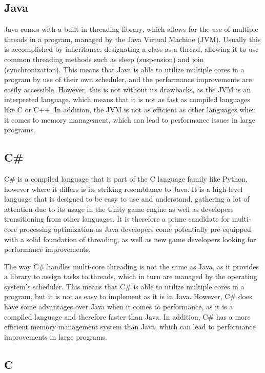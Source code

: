 \documentclass{article}
\begin{document}
\subsection{Java}

Java comes with a built-in threading library, which allows for the use of multiple threads in a program, managed by the Java Virtual Machine (JVM). Usually this is accomplished by inheritance, designating a class as a thread, allowing it to use common threading methods such as sleep (suspension) and join (synchronization). This means that Java is able to utilize multiple cores in a program by use of their own scheduler, and the performance improvements are easily accessible. However, this is not without its drawbacks, as the JVM is an interpreted language, which means that it is not as fast as compiled languages like C or C++. In addition, the JVM is not as efficient as other languages when it comes to memory management, which can lead to performance issues in large programs. 

\subsection{C\#}

C\# is a compiled language that is part of the C language family like Python, however where it differs is its striking resemblance to Java. It is a high-level language that is designed to be easy to use and understand, gathering a lot of attention due to its usage in the Unity game engine as well as developers transitioning from other languages. It is therefore a prime candidate for multi-core processing optimization as Java developers come potentially pre-equipped with a solid foundation of threading, as well as new game developers looking for performance improvements.

The way C\# handles multi-core threading is not the same as Java, as it provides a library to assign tasks to threads, which in turn are managed by the operating system's scheduler. This means that C\# is able to utilize multiple cores in a program, but it is not as easy to implement as it is in Java. However, C\# does have some advantages over Java when it comes to performance, as it is a compiled language and therefore faster than Java. In addition, C\# has a more efficient memory management system than Java, which can lead to performance improvements in large programs.

\subsection{C}
\end{document}
